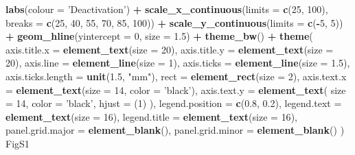 \documentclass[
]{krantz}
\makeatletter
\newenvironment{Shaded}{\begin{snugshade}}{\end{snugshade}}
\newcommand{\DataTypeTok}[1]{\textcolor[rgb]{0.13,0.29,0.53}{#1}}
\newcommand{\DecValTok}[1]{\textcolor[rgb]{0.00,0.00,0.81}{#1}}
\newcommand{\FloatTok}[1]{\textcolor[rgb]{0.00,0.00,0.81}{#1}}
\newcommand{\KeywordTok}[1]{\textcolor[rgb]{0.13,0.29,0.53}{\textbf{#1}}}
\newcommand{\NormalTok}[1]{#1}
\newcommand{\OperatorTok}[1]{\textcolor[rgb]{0.81,0.36,0.00}{\textbf{#1}}}
\newcommand{\StringTok}[1]{\textcolor[rgb]{0.31,0.60,0.02}{#1}}
\newenvironment{kframe}{%
\medskip{}
\setlength{\fboxsep}{.8em}
 \def\at@end@of@kframe{}%
 \ifinner\ifhmode%
  \def\at@end@of@kframe{\end{minipage}}%
  \begin{minipage}{\columnwidth}%
 \fi\fi%
 \def\FrameCommand##1{\hskip\@totalleftmargin \hskip-\fboxsep
 \colorbox{shadecolor}{##1}\hskip-\fboxsep
     \hskip-\linewidth \hskip-\@totalleftmargin \hskip\columnwidth}%
 \MakeFramed {\advance\hsize-\width
   \@totalleftmargin\z@ \linewidth\hsize
   \@setminipage}}%
 {\par\unskip\endMakeFramed%
 \at@end@of@kframe}
\renewenvironment{Shaded}{\begin{kframe}}{\end{kframe}}
\makeatother
\begin{document}
\begin{Shaded}
\begin{Highlighting}[]
\StringTok{  }\KeywordTok{labs}\NormalTok{(}\DataTypeTok{colour =} \StringTok{'Deactivation'}\NormalTok{) }\OperatorTok{+}
\StringTok{  }\KeywordTok{scale_x_continuous}\NormalTok{(}\DataTypeTok{limits =} \KeywordTok{c}\NormalTok{(}\DecValTok{25}\NormalTok{, }\DecValTok{100}\NormalTok{),}
                     \DataTypeTok{breaks =} \KeywordTok{c}\NormalTok{(}\DecValTok{25}\NormalTok{, }\DecValTok{40}\NormalTok{, }\DecValTok{55}\NormalTok{, }\DecValTok{70}\NormalTok{, }\DecValTok{85}\NormalTok{, }\DecValTok{100}\NormalTok{)) }\OperatorTok{+}
\StringTok{  }\KeywordTok{scale_y_continuous}\NormalTok{(}\DataTypeTok{limits =} \KeywordTok{c}\NormalTok{(}\OperatorTok{-}\DecValTok{5}\NormalTok{, }\DecValTok{5}\NormalTok{)) }\OperatorTok{+}
\StringTok{  }\KeywordTok{geom_hline}\NormalTok{(}\DataTypeTok{yintercept =} \DecValTok{0}\NormalTok{, }\DataTypeTok{size =} \FloatTok{1.5}\NormalTok{) }\OperatorTok{+}
\StringTok{  }\KeywordTok{theme_bw}\NormalTok{() }\OperatorTok{+}
\StringTok{  }\KeywordTok{theme}\NormalTok{(}
    \DataTypeTok{axis.title.x =} \KeywordTok{element_text}\NormalTok{(}\DataTypeTok{size =} \DecValTok{20}\NormalTok{),}
    \DataTypeTok{axis.title.y =} \KeywordTok{element_text}\NormalTok{(}\DataTypeTok{size =} \DecValTok{20}\NormalTok{),}
    \DataTypeTok{axis.line =} \KeywordTok{element_line}\NormalTok{(}\DataTypeTok{size =} \DecValTok{1}\NormalTok{),}
    \DataTypeTok{axis.ticks =} \KeywordTok{element_line}\NormalTok{(}\DataTypeTok{size =} \FloatTok{1.5}\NormalTok{),}
    \DataTypeTok{axis.ticks.length =} \KeywordTok{unit}\NormalTok{(}\FloatTok{1.5}\NormalTok{, }\StringTok{"mm"}\NormalTok{),}
    \DataTypeTok{rect =} \KeywordTok{element_rect}\NormalTok{(}\DataTypeTok{size =} \DecValTok{2}\NormalTok{),}
    \DataTypeTok{axis.text.x =} \KeywordTok{element_text}\NormalTok{(}\DataTypeTok{size =} \DecValTok{14}\NormalTok{, }\DataTypeTok{color =} \StringTok{'black'}\NormalTok{),}
    \DataTypeTok{axis.text.y =}
      \KeywordTok{element_text}\NormalTok{(}
        \DataTypeTok{size =} \DecValTok{14}\NormalTok{,}
        \DataTypeTok{color =} \StringTok{'black'}\NormalTok{,}
        \DataTypeTok{hjust =}\NormalTok{ (}\DecValTok{1}\NormalTok{)}
\NormalTok{      ),}
    \DataTypeTok{legend.position =} \KeywordTok{c}\NormalTok{(}\FloatTok{0.8}\NormalTok{, }\FloatTok{0.2}\NormalTok{),}
    \DataTypeTok{legend.text =} \KeywordTok{element_text}\NormalTok{(}\DataTypeTok{size =} \DecValTok{16}\NormalTok{),}
    \DataTypeTok{legend.title =} \KeywordTok{element_text}\NormalTok{(}\DataTypeTok{size =} \DecValTok{16}\NormalTok{),}
    \DataTypeTok{panel.grid.major =} \KeywordTok{element_blank}\NormalTok{(),}
    \DataTypeTok{panel.grid.minor =} \KeywordTok{element_blank}\NormalTok{()}
\NormalTok{  )}
\NormalTok{FigS1}
\end{Highlighting}
\end{Shaded}
\end{document}
